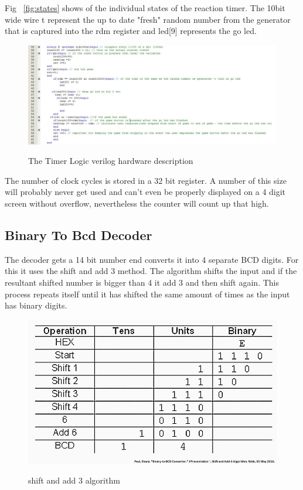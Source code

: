 \documentclass[paper=a4, fontsize=11pt]{scrartcl}
\numberwithin{equation}{section}		%
\numberwithin{figure}{section}			%
\numberwithin{table}{section}				%
\begin{document}
\begin{center}
Fig ~\ref{fig:states} shows of the individual states of the reaction timer. The 10bit wide wire t represent the up to date "fresh" random number from the generator that is captured into the rdm register and led[9] represents the go led.


\begin{figure}[h!]
\centering
\caption{The Timer Logic verilog hardware description}
\includegraphics[scale=0.5]{code}
\label{fig:code}
\end{figure}

The number of clock cycles is stored in a 32 bit register. A number of this size will probably never get used and can't even be properly displayed on a 4 digit screen without overflow, nevertheless the counter will count up that high.



\subsection{Binary To Bcd Decoder}

The decoder gets a 14 bit number end converts it into 4 separate BCD digits. For this it uses the shift and add 3 method. The algorithm shifts the input and if the resultant shifted number is bigger than 4 it add 3 and then shift again. This process repeats itself until it has shifted the same amount of times as the input has binary digits.

\begin{figure}[h!]
\centering
\caption{shift and add 3 algorithm}
\includegraphics[scale=0.7]{add3}
\label{fig:add}
\end{figure}


\end{center}
\end{document}
